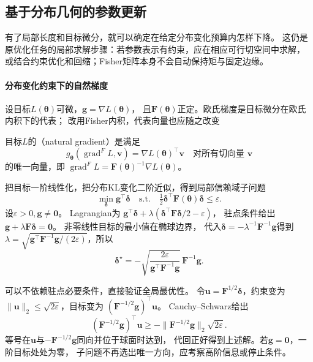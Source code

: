 \subsection{基于分布几何的参数更新}
\label{sec:information-geometric-update}

有了局部长度和目标微分，就可以确定在给定分布变化预算内怎样下降。
这仍是原优化任务的局部求解步骤：若参数表示有约束，应在相应可行切空间中求解，
或结合约束优化和回缩；Fisher矩阵本身不会自动保持矩与固定边缘。

\paragraph{分布变化约束下的自然梯度}
\label{sec:information-natural-gradient-update}

设目标\(L(\bm\theta)\)可微，\(\bm g=\nabla L(\bm\theta)\)，
且\(\bm F(\bm\theta)\)正定。欧氏梯度是目标微分在欧氏内积下的代表；
改用Fisher内积，代表向量也应随之改变
\begin{definition}[自然梯度]
\label{def:information-natural-gradient}
目标\(L\)的（natural gradient）是满足
\[
  g_{\bm\theta}(\operatorname{grad}^{F}L,\bm v)
  =\nabla L(\bm\theta)^\top\bm v
  \quad\text{对所有切向量 }\bm v
\]
的唯一向量，即
\(\operatorname{grad}^{F}L=\bm F(\bm\theta)^{-1}\nabla L(\bm\theta)\)。
\end{definition}

把目标一阶线性化，把分布KL变化二阶近似，得到局部信赖域子问题
\begin{equation}
  \min_{\bm\delta}\bm g^\top\bm\delta
  \quad\text{s.t.}\quad
  \tfrac12\bm\delta^\top\bm F(\bm\theta)\bm\delta\leq\varepsilon.
  \label{eq:information-natural-gradient-trust-region}
\end{equation}
设\(\varepsilon>0,\bm g\neq\bm0\)。
Lagrangian为
\(\bm g^\top\bm\delta+\lambda(\bm\delta^\top\bm F\bm\delta/2-\varepsilon)\)，
驻点条件给出
\(\bm g+\lambda\bm F\bm\delta=\bm0\)。
非零线性目标的最小值在椭球边界，
代入\(\bm\delta=-\lambda^{-1}\bm F^{-1}\bm g\)得到
\(\lambda=\sqrt{\bm g^\top\bm F^{-1}\bm g/(2\varepsilon)}\)，所以
\begin{equation}
  \bm\delta^\star
  =-\sqrt{\frac{2\varepsilon}{\bm g^\top\bm F^{-1}\bm g}}\,
    \bm F^{-1}\bm g.
  \label{eq:information-natural-gradient-step}
\end{equation}

可以不依赖驻点必要条件，直接验证全局最优性。
令\(\bm u=\bm F^{1/2}\bm\delta\)，约束变为
\(\|\bm u\|_2\leq\sqrt{2\varepsilon}\)，目标变为
\((\bm F^{-1/2}\bm g)^\top\bm u\)。
Cauchy--Schwarz给出
\[
  (\bm F^{-1/2}\bm g)^\top\bm u
  \geq-\|\bm F^{-1/2}\bm g\|_2\sqrt{2\varepsilon}.
\]
等号在\(\bm u\)与\(-\bm F^{-1/2}\bm g\)同向并位于球面时达到，
代回正好得到上述解。若\(\bm g=\bm0\)，一阶目标处处为零，
子问题不再选出唯一方向，应考察高阶信息或停止条件。

